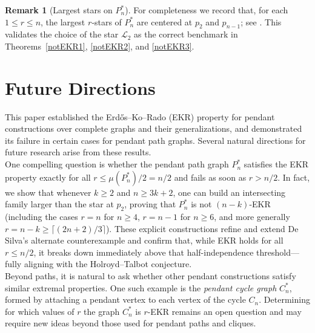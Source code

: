 \documentclass{article}
\theoremstyle{definition}
\newtheorem{remark}[theorem]{Remark}
\newcommand{\1}{\mathbf{1}}
\begin{document}
\begin{remark}[Largest stars on $P_n^*$]
For completeness we record that, for each $1\le r\le n$, the largest $r$‑stars of $P_n^*$ are centered at $p_2$ and $p_{n-1}$; see \cite[Theorem 5]{DeSilvaDDH2023}. This validates the choice of the star $\mathcal{L}_2$ as the correct benchmark in Theorems~\ref{notEKR1}, \ref{notEKR2}, and \ref{notEKR3}.
\end{remark}









\section{Future Directions} \label{sec6}

This paper established the Erdős--Ko--Rado (EKR) property for pendant constructions over complete graphs and their generalizations, and demonstrated its failure in certain cases for pendant path graphs. Several natural directions for future research arise from these results.\\

\noindent One compelling question is whether the pendant path graph $P_n^*$ satisfies the EKR property exactly for all $r \le \mu(P_n^*)/2 = n/2$ and fails as soon as $r > n/2$. In fact, we show that whenever $k \ge 2$ and $n \ge 3k+2$, one can build an intersecting family larger than the star at $p_2$, proving that $P_n^*$ is not $(n-k)$-EKR (including the cases $r=n$ for $n\ge4$, $r=n-1$ for $n\ge6$, and more generally $r=n-k\ge\lceil(2n+2)/3\rceil$). These explicit constructions refine and extend De Silva’s alternate counterexample and confirm that, while EKR holds for all $r \le n/2$, it breaks down immediately above that half-independence threshold—fully aligning with the Holroyd–Talbot conjecture.\\

\noindent Beyond paths, it is natural to ask whether other pendant constructions satisfy similar extremal properties. One such example is the \emph{pendant cycle graph} $C_n^*$, formed by attaching a pendant vertex to each vertex of the cycle $C_n$. Determining for which values of $r$ the graph $C_n^*$ is $r$-EKR remains an open question and may require new ideas beyond those used for pendant paths and cliques.\\
\end{document}
